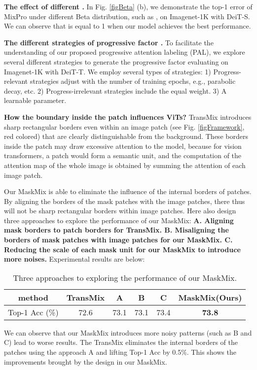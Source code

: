 \documentclass{article} \usepackage{iclr2023_conference,times}
\begin{document}
\textbf{The effect of different .}
In Fig. \ref{figBeta} (b), we demonstrate the top-1 error of MixPro under different Beta distribution, such as , on Imagenet-1K with DeiT-S. We can observe that  is equal to 1 when our model achieves the best performance.

\textbf{The different strategies of progressive factor .}
To facilitate the understanding of our proposed progressive attention labeling (PAL), we explore several different strategies to generate the progressive factor  evaluating on Imagenet-1K with DeiT-T. We employ several types of strategies: 1) Progress-relevant strategies adjust  with the number of training epochs, e.g., parabolic decay, etc. 2) Progress-irrelevant strategies include the equal weight. 3) A learnable parameter.

\textbf{How the boundary inside the patch influences ViTs? } TransMix introduces sharp rectangular borders even within an image patch (see Fig. \ref{figFramework}, red colored) that are clearly distinguishable from the background. These borders inside the patch may draw excessive attention to the model, because for vision transformers, a patch would form a semantic unit, and the computation of the attention map of the whole image is obtained by summing the attention of each image patch.

Our MaskMix is able to eliminate the influence of the internal borders of patches. By aligning the borders of the mask patches with the image patches, there thus will not be sharp rectangular borders within image patches. Here also design three approaches to explore the performance of our MaskMix: \textbf{A. Aligning mask borders to patch borders for TransMix. B. Misaligning the borders of mask patches with image patches for our MaskMix. C. Reducing the scale of each mask unit for our MaskMix to introduce more noises.} Experimental results are below:
\begin{table}[!htb]
\caption{Three approaches to exploring the performance of our MaskMix.}
\label{tabStra}
	\centering
	\begin{tabular}{c|ccccc}
    \toprule
     method  & TransMix & A & B & C & MaskMix(Ours) \\
    \midrule

    Top-1 Acc (\%)  &  72.6 & 73.1 & 73.1 &73.4 & \textbf{73.8}
    
\end{tabular}
\end{table}

We can observe that our MaskMix introduces more noisy patterns (such as B and C) lead to worse results. The TransMix eliminates the internal borders of the patches using the approach A and lifting Top-1 Acc by 0.5\%. This shows the improvements brought by the design in our MaskMix.
\end{document}
